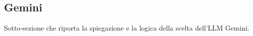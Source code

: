 \subsection{Gemini}

Sotto-sezione che riporta la spiegazione e la logica della scelta dell'LLM Gemini.